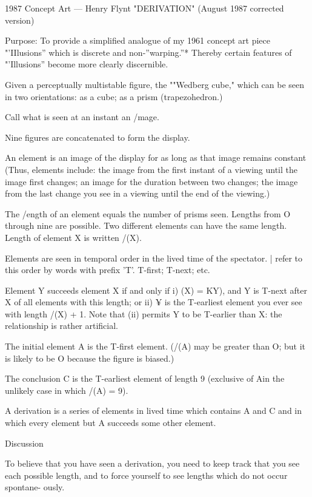 1987 Concept Art --- Henry Flynt 
"DERIVATION" (August 1987 corrected version) 


Purpose: To provide a simplified analogue of my 1961 concept art piece "'IIlusions'' which is 
discrete and non-''warping.''* Thereby certain features of "'Illusions'' become more 
clearly discernible. 


Given a perceptually multistable figure, the ""Wedberg cube," which can be seen in two 
orientations: as a cube; as a prism (trapezohedron.) 

Call what is seen at an instant an /mage. 

Nine figures are concatenated to form the display. 


An element is an image of the display for as long as that image remains constant (Thus, 
elements include: the image from the first instant of a viewing until the image first 
changes; an image for the duration between two changes; the image from the last 
change you see in a viewing until the end of the viewing.) 


The /ength of an element equals the number of prisms seen. Lengths from O through nine 
are possible. Two different elements can have the same length. Length of element X 
is written /(X). 


Elements are seen in temporal order in the lived time of the spectator. | refer to this order by 
words with prefix 'T'. T-first; T-next; etc. 


Element Y succeeds element X if and only if 
i) (X) = KY), and Y is T-next after X of all elements with this length; or 
ii) ¥ is the T-earliest element you ever see with length /(X) + 1. 
Note that (ii) permits Y to be T-earlier than X: the relationship is rather artificial. 


The initial element A is the T-first element. (/(A) may be greater than O; but it is likely to be O 
because the figure is biased.) 


The conclusion C is the T-earliest element of length 9 (exclusive of Ain the unlikely case in 
which /(A) = 9). 


A derivation is a series of elements in lived time which contains A and C and in which every 
element but A succeeds some other element. 


Discussion 

To believe that you have seen a derivation, you need to keep track that you see each 
possible length, and to force yourself to see lengths which do not occur spontane- 
ously. 



